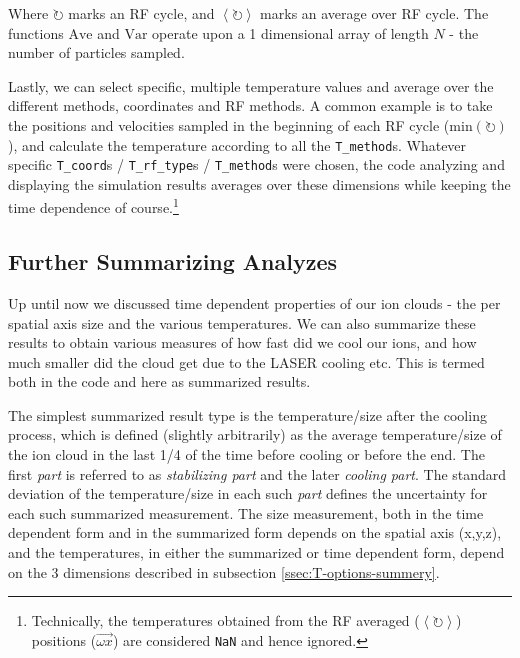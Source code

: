 Where $\circlearrowright$ marks an RF cycle, and $\left\langle\circlearrowright\right\rangle$ marks an average over RF cycle. The functions $\mathrm{Ave}$ and $\mathrm{Var}$ operate upon a 1 dimensional array of length $N$ - the number of particles sampled.

Lastly, we can select specific, multiple temperature values and average over the different methods, coordinates and RF methods. A common example is to take the positions and velocities sampled in the beginning of each RF cycle ($\mathrm{min}\left(\circlearrowright\right)$), and calculate the temperature according to all the \texttt{T\_method}s. Whatever specific \texttt{T\_coord}s / \texttt{T\_rf\_type}s / \texttt{T\_method}s were chosen, the code analyzing and displaying the simulation results averages over these dimensions while keeping the time dependence of course.\footnote{Technically, the temperatures obtained from the RF averaged ($\left\langle\circlearrowright\right\rangle$) positions ($\overrightarrow{\omega x}$) are considered \texttt{NaN} and hence ignored.}

\subsection{Further Summarizing Analyzes}

Up until now we discussed time dependent properties of our ion clouds - the per spatial axis size and the various temperatures. We can also summarize these results to obtain various measures of how fast did we cool our ions, and how much smaller did the cloud get due to the LASER cooling etc. This is termed both in the code and here as summarized results.

The simplest summarized result type is the temperature/size after the cooling process, which is defined (slightly arbitrarily) as the average temperature/size of the ion cloud in the last 1/4 of the time before cooling or before the end. The first \textit{part} is referred to as \textit{stabilizing part} and the later \textit{cooling part}. The standard deviation of the temperature/size in each such \textit{part} defines the uncertainty for each such summarized measurement. The size measurement, both in the time dependent form and in the summarized form depends on the spatial axis (x,y,z), and the temperatures, in either the summarized or time dependent form, depend on the 3 dimensions described in subsection \ref{ssec:T-options-summery}.

